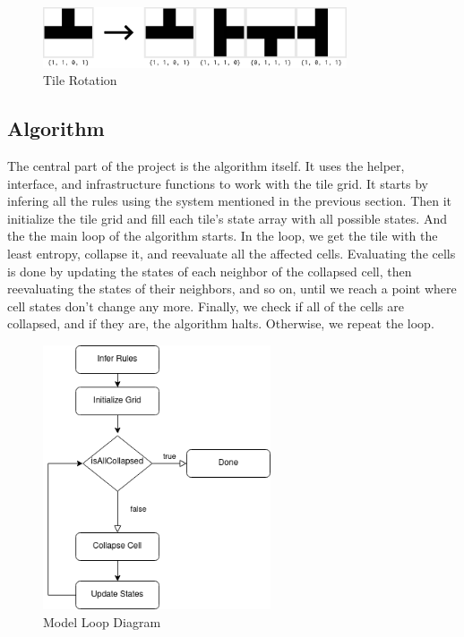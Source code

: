 \documentclass[10pt,oneside,a4paper]{article}
\begin{document}
\begin{figure}[ht]
    \centering
    \includegraphics[width=0.8\textwidth]{figures/tile_rotation_example.png}
    \caption{Tile Rotation}\label{fig:tile_rotation_example}
\end{figure}

\subsection{Algorithm}\label{sec:algorithm}
The central part of the project is the algorithm itself.
It uses the helper, interface, and infrastructure functions to work with the tile grid.
It starts by infering all the rules using the system mentioned in the previous section.
Then it initialize the tile grid and fill each tile's state array with all possible states.
And the the main loop of the algorithm starts.
In the loop, we get the tile with the least entropy, collapse it, and reevaluate all the affected cells.
Evaluating the cells is done by updating the states of each neighbor of the collapsed cell, then reevaluating the states of their neighbors, and so on, until we reach a point where cell states don't change any more.
Finally, we check if all of the cells are collapsed, and if they are, the algorithm halts.
Otherwise, we repeat the loop.

\begin{figure}[ht]
    \centering
    \includegraphics[width=0.6\textwidth]{figures/model_loop_diagram.png}
    \caption{Model Loop Diagram}\label{fig:model_loop_diagram}
\end{figure}
\end{document}
